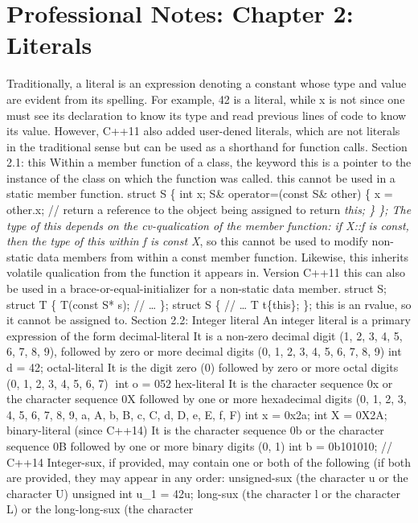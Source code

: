 \hypertarget{professional-notes-chapter-2-literals}{%
\section{Professional Notes: Chapter 2:
Literals}\label{professional-notes-chapter-2-literals}}

Traditionally, a literal is an expression denoting a constant whose type
and value are evident from its spelling. For example, 42 is a literal,
while x is not since one must see its declaration to know its type and
read previous lines of code to know its value. However, C++11 also added
user-dened literals, which are not literals in the traditional sense but
can be used as a shorthand for function calls. Section 2.1: this Within
a member function of a class, the keyword this is a pointer to the
instance of the class on which the function was called. this cannot be
used in a static member function. struct S \{ int x; S\& operator=(const
S\& other) \{ x = other.x; // return a reference to the object being
assigned to return \emph{this; \} \}; The type of this depends on the
cv-qualication of the member function: if X::f is const, then the type
of this within f is const X}, so this cannot be used to modify
non-static data members from within a const member function. Likewise,
this inherits volatile qualication from the function it appears in.
Version C++11 this can also be used in a brace-or-equal-initializer for
a non-static data member. struct S; struct T \{ T(const S* s); //
\ldots{} \}; struct S \{ // \ldots{} T t\{this\}; \}; this is an rvalue,
so it cannot be assigned to. Section 2.2: Integer literal An integer
literal is a primary expression of the form decimal-literal It is a
non-zero decimal digit (1, 2, 3, 4, 5, 6, 7, 8, 9), followed by zero or
more decimal digits (0, 1, 2, 3, 4, 5, 6, 7, 8, 9) int d = 42;
octal-literal It is the digit zero (0) followed by zero or more octal
digits (0, 1, 2, 3, 4, 5, 6, 7) int o = 052 hex-literal It is the
character sequence 0x or the character sequence 0X followed by one or
more hexadecimal digits (0, 1, 2, 3, 4, 5, 6, 7, 8, 9, a, A, b, B, c, C,
d, D, e, E, f, F) int x = 0x2a; int X = 0X2A; binary-literal (since
C++14) It is the character sequence 0b or the character sequence 0B
followed by one or more binary digits (0, 1) int b = 0b101010; // C++14
Integer-sux, if provided, may contain one or both of the following (if
both are provided, they may appear in any order: unsigned-sux (the
character u or the character U) unsigned int u\_1 = 42u; long-sux (the
character l or the character L) or the long-long-sux (the character
